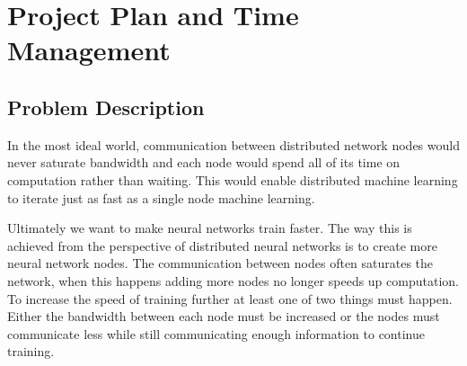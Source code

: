 \clearpage
\section{Project Plan and Time Management}


\subsection{Problem Description}

In the most ideal world, communication between distributed network nodes would
never saturate bandwidth and each node would spend all of its time on
computation rather than waiting. This would enable distributed machine learning
to iterate just as fast as a single node machine learning.

Ultimately we want to make neural networks train faster. The way this is
achieved from the perspective of distributed neural networks is to create more
neural network nodes. The communication between nodes often saturates the
network, when this happens adding more nodes no longer speeds up computation. To
increase the speed of training further at least one of two things must happen.
Either the bandwidth between each node must be increased or the nodes must
communicate less while still communicating enough information to continue training.








